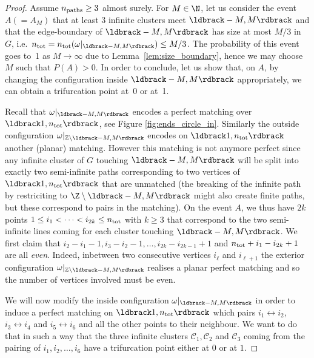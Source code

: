 \documentclass[12pt]{amsart}
\newcommand{\npath}{n_{\rm paths}}
\theoremstyle{remark}
\newcommand{\Li}{\ldbrack} %
\newcommand{\Ri}{\rdbrack}
\begin{document}
\begin{proof}
Assume $\npath\ge3$ almost surely. For $M\in\N$, let us consider the event $A(=A_M)$ that at least 3 infinite clusters meet $\Li-M,M\Ri$ and that the edge-boundary of $\Li-M,M\Ri$ has size at most $M/3$ in $G$, i.e.~$\ntot=\ntot(\omega |_{\Li-M,M\Ri})\le M/3$. The probability of this event goes to~1 as $M\to\infty$ due to Lemma~\ref{lem:size_boundary}, hence we may choose $M$ such that $P(A)>0$. In order to conclude, let us show that, on $A$, by changing the configuration inside $\Li-M,M\Ri$ appropriately, we can obtain a trifurcation point at~0 or at~1.

Recall that $\omega |_{\Li -M,M \Ri}$ encodes a perfect matching over $\Li 1, \ntot \Ri$, see Figure \ref{fig:ends_circle_in}. Similarly the outside configuration $\omega |_{ \mathbb{Z} \backslash \Li -M,M \Ri}$ encodes on $\Li 1 , \ntot \Ri$ another (planar) matching. However this matching is not anymore perfect since any infinite cluster of $G$ touching $\Li -M,M\Ri$ will be split into exactly two semi-infinite paths 
corresponding to two vertices of $\Li 1, \ntot \Ri$ that are unmatched (the breaking of the infinite path by restriciting to $\Z\setminus\Li -M,M\Ri$ might also create finite paths, but these correspond to pairs in the matching). On the event $A$, we thus have $2k$ points $1 \leq i_{1} < \cdots < i_{2k} \leq n_{\rm tot}$ with $k \geq 3$ that correspond to the two semi-infinite lines coming for each cluster touching $\Li -M,M \Ri$. We first claim that $i_{2}-i_{1}-1, i_{3}-i_{2}-1, \ldots , i_{2k}-i_{2k-1}+1$ and $n_{\rm tot}+i_{1}-i_{2k}+1$ are all \emph{even}. Indeed, inbetween two consecutive vertices $i_{\ell}$ and $i_{\ell+1}$ the exterior configuration $\omega |_{ \mathbb{Z} \backslash \Li -M,M\Ri}$ realises a planar perfect matching and so the number of vertices involved must be even.

We will now  modify the inside configuration $\omega |_{ \Li -M,M\Ri}$ in order to induce a perfect matching on $\Li 1, \ntot \Ri$ which pairs $i_{1} \leftrightarrow i_{2}$, $i_{3} \leftrightarrow i_{4}$ and $i_{5}\leftrightarrow i_{6}$ 
and all the other points to their neighbour. We want to do that in such a way that the three infinite clusters $ \mathcal{C}_{1}, \mathcal{C}_{2}$ and $ \mathcal{C}_{3}$ coming from the pairing of $i_{1},i_{2},\ldots, i_{6}$  have a trifurcation point either at $0$ or at $1$.


\end{proof}
\end{document}

